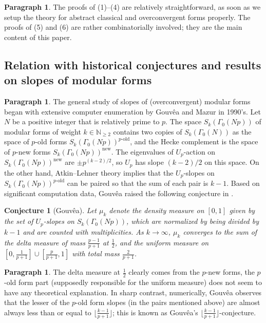 \documentclass[12pt]{amsart}
\newtheorem{conjecture}[subsection]{Conjecture}
\theoremstyle{definition}
\newtheorem{para}[subsection]{Paragraph}
\numberwithin{equation}{subsection}
\def\NN{\mathbb{N}}
\newcommand{\new}{\mathrm{new}}
\newcommand{\old}{\textrm{-}\mathrm{old}}
\begin{document}
\begin{para}
\label{P:para_020}
The proofs of (1)--(4) are relatively straightforward, as soon as we setup the theory for abstract classical and overconvergent forms properly. The proofs of (5) and (6) are rather combinatorially involved; they are the main content of this paper.
\end{para}


\subsection{Relation with historical conjectures and results on slopes of modular forms}

\begin{para}
\label{P:para_021}
The general study of slopes of (overconvergent) modular forms began with extensive computer enumeration by Gouv\^ea and Mazur \cite{gouvea-mazur, gouvea} in 1990's.
Let $N$ be a positive integer that is relatively prime to $p$.
The space $S_k(\Gamma_0(Np))$ of modular forms of weight $k \in \NN_{\geq 2}$ contains two copies of $S_k(\Gamma_0(N))$ as the space of $p$-old forms $S_k(\Gamma_0(Np))^{p\old}$, and the Hecke complement is the space of $p$-new forms $S_k(\Gamma_0(Np))^{\new}$. The eigenvalues of $U_p$-action on $S_k(\Gamma_0(Np))^{\new}$ are $\pm p^{(k-2)/2}$, so $U_p$ has slope $(k-2)/2$ on this space. On the other hand, Atkin--Lehner theory implies that the $U_p$-slopes on $S_k(\Gamma_0(Np))^{p\old}$ can be paired so that the sum of each pair is $k-1$.
Based on significant computation data, 
Gouv\^ea raised the following conjecture in \cite{gouvea}.
\end{para}

\begin{conjecture}
[Gouv\^ea]
\label{Conj:Gouvea} Let $\mu_k$ denote the density measure on $[0,1]$ given by the set of $U_p$-slopes on $S_k(\Gamma_0(Np))$, which are normalized by being divided by $k-1$ and are counted with multiplicities.
As $k \to \infty$, $\mu_k$ converges to the sum of the delta measure of mass $\frac{p-1}{p+1}$ at $\frac 12$, and the uniform measure on $[0, \frac 1{p+1}] \cup [\frac p{p+1}, 1]$ with total mass $\frac 2{p+1}$.
\end{conjecture}
\begin{para}
\label{P:para_022}
The delta measure at $\frac 12$ clearly comes from the $p$-new forms, the $p$-old form part (supposedly responsible for the uniform measure) does not seem to have any theoretical explanation. In sharp contrast, numerically, 
Gouv\^ea observes that the lesser of the $p$-old form slopes (in the pairs mentioned above) are almost always less than or equal to $\big\lfloor\frac{k-1}{p+1}\big\rfloor$; this is known as Gouv\^ea's $\big\lfloor\frac{k-1}{p+1}\big\rfloor$-conjecture.
\end{para}
\end{document}
